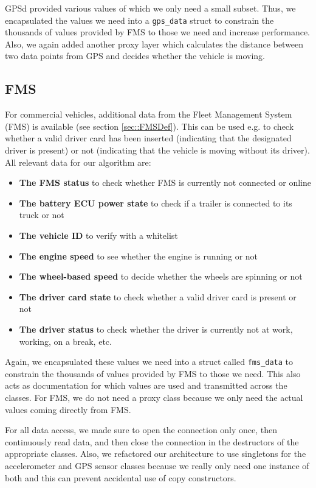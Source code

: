 GPSd provided various values of which we only need a small subset. Thus, we encapsulated the values we need into a \texttt{gps\_data} struct to constrain the thousands of values provided by FMS to those we need and increase performance. Also, we again added another proxy layer which calculates the distance between two data points from GPS and decides whether the vehicle is moving.

\subsection{FMS}
\label{sec::FMSUse}
For commercial vehicles, additional data from the Fleet Management System (FMS) is available (see section \ref{sec::FMSDef}). This can be used e.g. to check whether a valid driver card has been inserted (indicating that the designated driver is present) or not (indicating that the vehicle is moving without its driver). All relevant data for our algorithm are:

\begin{itemize}
	\item \textbf{The FMS status} to check whether FMS is currently not connected or online
	\item \textbf{The battery ECU power state} to check if a trailer is connected to its truck or not
	\item \textbf{The vehicle ID} to verify with a whitelist
	\item \textbf{The engine speed} to see whether the engine is running or not
	\item \textbf{The wheel-based speed} to decide whether the wheels are spinning or not
	\item \textbf{The driver card state} to check whether a valid driver card is present or not
	\item \textbf{The driver status} to check whether the driver is currently not at work, working, on a break, etc.
\end{itemize}

Again, we encapsulated these values we need into a struct called \texttt{fms\_data} to constrain the thousands of values provided by FMS to those we need. This also acts as documentation for which values are used and transmitted across the classes. For FMS, we do not need a proxy class because we only need the actual values coming directly from FMS.

\vspace{.5cm}

For all data access, we made sure to open the connection only once, then continuously read data, and then close the connection in the destructors of the appropriate classes. Also, we refactored our architecture to use singletons for the accelerometer and GPS sensor classes because we really only need one instance of both and this can prevent accidental use of copy constructors.

